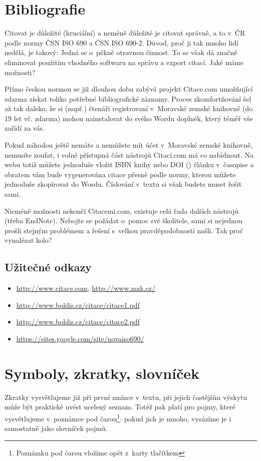 \section{Bibliografie}
Citovat je důležité (kruciální) a neméně důležité je citovat správně, a to v~ČR podle normy ČSN ISO 690 a ČSN ISO 690-2.
Důvod, proč ji tak mnoho lidí nedělá, je takový: Jedná se o~pěkně otravnou činnost\cite{citovani}.
To se však dá značně eliminovat použitím vhodného softwaru na správu a export citací.
Jaké máme možnosti?

Přímo českou normou se již dlouhou dobu zabývá projekt Citace.com umožňující zdarma získat toliko potřebné bibliografické záznamy.
Proces zkomfortňování šel až tak daleko, že si (např.) čtenáři registrovaní v~Moravské zemské knihovně (do 19 let vč.
zdarma) mohou nainstalovat do svého Wordu doplněk, který téměř vše zařídí za vás.

Pokud náhodou ještě nemáte a nemůžete mít účet v~Moravské zemské knihovně, nemusíte zoufat, i volně přístupná část nástrojů Citací.com má co nabídnout.
Na webu totiž můžete jednoduše vložit ISBN knihy nebo DOI () článku v~časopise a obratem vám bude vygenerována citace přesně podle normy, kterou můžete jednoduše zkopírovat do Wordu.
Číslování v~textu si však budete muset řešit sami.

Nicméně možnosti nekončí Citacemi.com, existuje celá řada dalších nástrojů (třeba EndNote).
Nebojte se požádat o~pomoc své školitele, sami si nejednou prošli stejným problémem a řešení s~velkou pravděpodobností našli.
Tak proč vynalézat kolo?

\subsection{Užitečné odkazy}
\begin{itemize}
    \item \url{http://www.citace.com}, \url{http://www.mzk.cz/}
	\item \url{http://www.boldis.cz/citace/citace1.pdf}
	\item \url{http://www.boldis.cz/citace/citace2.pdf}
	\item \url{https://sites.google.com/site/novaiso690/}
\end{itemize}

\section{Symboly, zkratky, slovníček}
Zkratky vysvětlujeme již při první zmínce v~textu, při jejich častějším výskytu může být praktické uvést ucelený seznam.
Totéž pak platí pro pojmy, které vysvětlujeme v~poznámce pod čarou\footnote{Poznámku pod čarou vložíme opět z~karty  tlačítkem }: pokud jich je mnoho, vysázíme je i samostatně jako slovníček pojmů.

